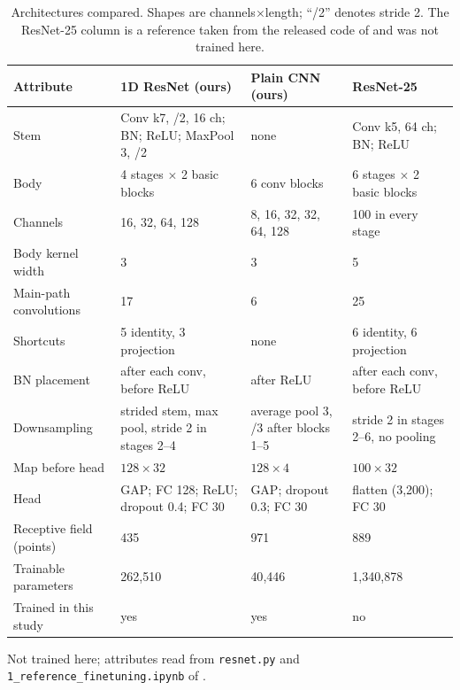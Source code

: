 \documentclass[journal,onecolumn]{IEEEtran}
\begin{document}
\begin{table}[!t]
  \centering
  \caption{Architectures compared. Shapes are channels${\times}$length;
  ``/2'' denotes stride 2. The ResNet-25 column is a reference taken from
  the released code of \cite{ho2019rapid} and was not trained here.}
  \label{tab:configs}
  \begin{threeparttable}
  \begin{tabular}{@{}l p{4.7cm} p{4.4cm} p{4.4cm}@{}}
    \toprule
    Attribute & 1D ResNet (ours) & Plain CNN (ours) & ResNet-25 \cite{ho2019rapid,ho2019bacteriaid}\tnote{a} \\
    \midrule
    Stem & Conv k7, /2, 16 ch; BN; ReLU; MaxPool 3, /2 & none & Conv k5, 64 ch; BN; ReLU \\
    Body & 4 stages ${\times}$ 2 basic blocks & 6 conv blocks & 6 stages ${\times}$ 2 basic blocks \\
    Channels & 16, 32, 64, 128 & 8, 16, 32, 32, 64, 128 & 100 in every stage \\
    Body kernel width & 3 & 3 & 5 \\
    Main-path convolutions & 17 & 6 & 25 \\
    Shortcuts & 5 identity, 3 projection & none & 6 identity, 6 projection \\
    BN placement & after each conv, before ReLU & after ReLU & after each conv, before ReLU \\
    Downsampling & strided stem, max pool, stride 2 in stages 2--4 & average pool 3, /3 after blocks 1--5 & stride 2 in stages 2--6, no pooling \\
    Map before head & $128{\times}32$ & $128{\times}4$ & $100{\times}32$ \\
    Head & GAP; FC 128; ReLU; dropout 0.4; FC 30 & GAP; dropout 0.3; FC 30 & flatten (3{,}200); FC 30 \\
    Receptive field (points) & 435 & 971 & 889 \\
    Trainable parameters & 262{,}510 & 40{,}446 & 1{,}340{,}878 \\
    Trained in this study & yes & yes & no \\
    \bottomrule
  \end{tabular}
  \begin{tablenotes}\footnotesize
    \item[a] Not trained here; attributes read from \texttt{resnet.py} and
    \texttt{1\_reference\_finetuning.ipynb} of \cite{ho2019bacteriaid}.
  \end{tablenotes}
  \end{threeparttable}
\end{table}
\end{document}
